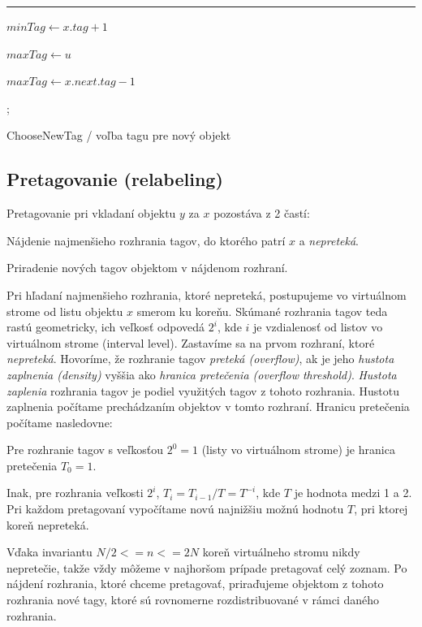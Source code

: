 \documentclass[
  digital,     %
  oneside,     %
  nosansbold,  %
  nocolorbold, %
  lof,         %
  lot,         %
]{fithesis4}
\begin{document}
\begin{algorithm}
\hrule\vspace{0.2em}
$minTag \leftarrow x.tag + 1$\;

$maxTag \leftarrow u$\;

{
    $maxTag \leftarrow x.next.tag - 1$\;
}

; 
\caption{ChooseNewTag / voľba tagu pre nový objekt  }
\end{algorithm}

\subsection{Pretagovanie (relabeling)}
Pretagovanie pri vkladaní objektu $y$ za $x$ pozostáva z 2 častí:
\begin{compactenum}
    \item Nájdenie najmenšieho rozhrania tagov, do ktorého patrí $x$ a \textit{nepreteká}.
    \item Priradenie nových tagov objektom v nájdenom rozhraní.
\end{compactenum}
Pri hľadaní najmenšieho rozhrania, ktoré nepreteká, postupujeme vo virtuálnom strome od listu objektu $x$ smerom ku koreňu. Skúmané rozhrania tagov teda rastú geometricky, ich veľkosť odpovedá $2^i$, kde $i$ je vzdialenosť od listov vo virtuálnom strome (interval level). Zastavíme sa na prvom rozhraní, ktoré \textit{nepreteká}.
Hovoríme, že rozhranie tagov \textit{preteká (overflow)}, ak je jeho \textit{hustota zaplnenia (density)} vyššia ako \textit{hranica pretečenia (overflow threshold)}. \textit{Hustota zaplenia} rozhrania tagov je podiel využitých tagov z tohoto rozhrania. Hustotu zaplnenia počítame prechádzaním objektov v tomto rozhraní. Hranicu pretečenia počítame nasledovne:
\begin{compactenum}
    \item Pre rozhranie tagov s veľkosťou $2^0 = 1$ (listy vo virtuálnom strome) je hranica pretečenia $T_0 = 1$.
    \item Inak, pre rozhrania veľkosti $2^i$, $T_i = T_{i-1} / T = T^{-i}$, kde $T$ je hodnota medzi 1 a 2. Pri každom pretagovaní vypočítame novú najnižšiu možnú hodnotu $T$, pri ktorej koreň nepreteká.
\end{compactenum}
Vďaka invariantu $N/2 <= n <= 2N$ koreň virtuálneho stromu nikdy nepretečie, takže vždy môžeme v najhoršom prípade pretagovať celý zoznam.
Po nájdení rozhrania, ktoré chceme pretagovať, priraďujeme objektom z tohoto rozhrania nové tagy, ktoré sú rovnomerne rozdistribuované v rámci daného rozhrania.
\end{document}

